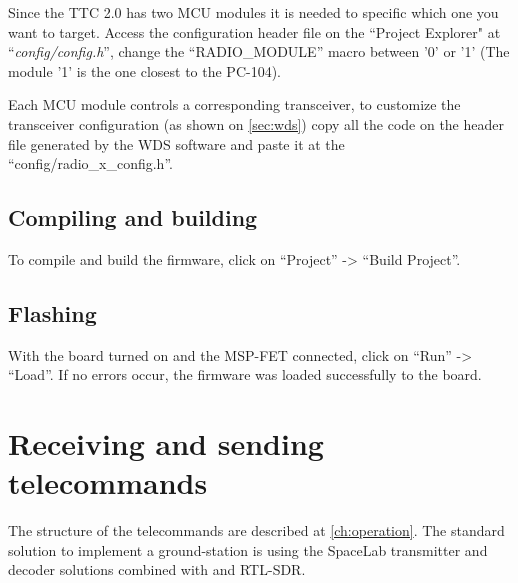 Since the TTC 2.0 has two MCU modules it is needed to specific which one you want to target. Access the configuration header file on the ``Project Explorer" at ``\textit{config/config.h}'', change the ``RADIO\_MODULE'' macro between '0' or '1' (The module '1' is the one closest to the PC-104).

Each MCU module controls a corresponding transceiver, to customize the transceiver configuration (as shown on \autoref{sec:wds}) copy all the code on the header file generated by the WDS software and paste it at the ``config/radio\_x\_config.h''.

\subsection{Compiling and building}

To compile and build the firmware, click on ``Project'' -> ``Build Project''.

\subsection{Flashing}

With the board turned on and the MSP-FET connected, click on ``Run'' -> ``Load''. If no errors occur, the firmware was loaded successfully to the board.

\section{Receiving and sending telecommands}

The structure of the telecommands are described at \autoref{ch:operation}. The standard solution to implement a ground-station is using the SpaceLab transmitter and decoder solutions \cite{sl-transmitter} \cite{sl-decoder} combined with and RTL-SDR.
